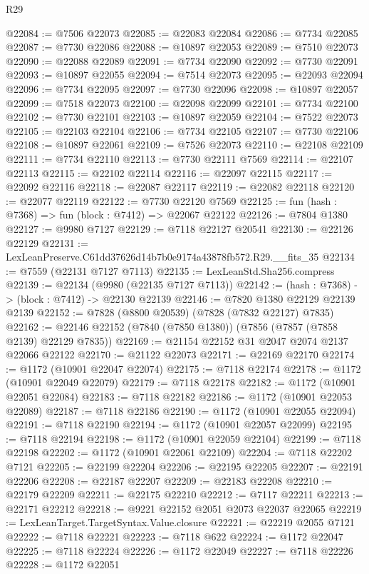 \begin{lexlean}{R29}
\begin{coremodule}
@22084 := @7506 @22073
@22085 := @22083 @22084
@22086 := @7734 @22085
@22087 := @7730 @22086
@22088 := @10897 @22053
@22089 := @7510 @22073
@22090 := @22088 @22089
@22091 := @7734 @22090
@22092 := @7730 @22091
@22093 := @10897 @22055
@22094 := @7514 @22073
@22095 := @22093 @22094
@22096 := @7734 @22095
@22097 := @7730 @22096
@22098 := @10897 @22057
@22099 := @7518 @22073
@22100 := @22098 @22099
@22101 := @7734 @22100
@22102 := @7730 @22101
@22103 := @10897 @22059
@22104 := @7522 @22073
@22105 := @22103 @22104
@22106 := @7734 @22105
@22107 := @7730 @22106
@22108 := @10897 @22061
@22109 := @7526 @22073
@22110 := @22108 @22109
@22111 := @7734 @22110
@22113 := @7730 @22111 @7569
@22114 := @22107 @22113
@22115 := @22102 @22114
@22116 := @22097 @22115
@22117 := @22092 @22116
@22118 := @22087 @22117
@22119 := @22082 @22118
@22120 := @22077 @22119
@22122 := @7730 @22120 @7569
@22125 := fun (hash : @7368) => fun (block : @7412) => @22067 @22122
@22126 := @7804 @1380
@22127 := @9980 @7127
@22129 := @7118 @22127 @20541
@22130 := @22126 @22129
@22131 := LexLeanPreserve.C61dd37626d14b7b0e9174a43878fb572.R29.__fits_35
@22134 := @7559 (@22131 @7127 @7113)
@22135 := LexLeanStd.Sha256.compress
@22139 := @22134 (@9980 (@22135 @7127 @7113))
@22142 := (hash : @7368) -> (block : @7412) -> @22130 @22139
@22146 := @7820 @1380 @22129 @22139 @2139
@22152 := @7828 (@8800 @20539) (@7828 (@7832 @22127) @7835)
@22162 := @22146 @22152 (@7840 (@7850 @1380)) (@7856 (@7857 (@7858 @2139) @22129 @7835))
@22169 := @21154 @22152 @31 @2047 @2074 @2137 @22066 @22122
@22170 := @21122 @22073
@22171 := @22169 @22170
@22174 := @1172 (@10901 @22047 @22074)
@22175 := @7118 @22174
@22178 := @1172 (@10901 @22049 @22079)
@22179 := @7118 @22178
@22182 := @1172 (@10901 @22051 @22084)
@22183 := @7118 @22182
@22186 := @1172 (@10901 @22053 @22089)
@22187 := @7118 @22186
@22190 := @1172 (@10901 @22055 @22094)
@22191 := @7118 @22190
@22194 := @1172 (@10901 @22057 @22099)
@22195 := @7118 @22194
@22198 := @1172 (@10901 @22059 @22104)
@22199 := @7118 @22198
@22202 := @1172 (@10901 @22061 @22109)
@22204 := @7118 @22202 @7121
@22205 := @22199 @22204
@22206 := @22195 @22205
@22207 := @22191 @22206
@22208 := @22187 @22207
@22209 := @22183 @22208
@22210 := @22179 @22209
@22211 := @22175 @22210
@22212 := @7117 @22211
@22213 := @22171 @22212
@22218 := @9221 @22152 @2051 @2073 @22037 @22065
@22219 := LexLeanTarget.TargetSyntax.Value.closure
@22221 := @22219 @2055 @7121
@22222 := @7118 @22221
@22223 := @7118 @622
@22224 := @1172 @22047
@22225 := @7118 @22224
@22226 := @1172 @22049
@22227 := @7118 @22226
@22228 := @1172 @22051

\end{coremodule}
\end{lexlean}
